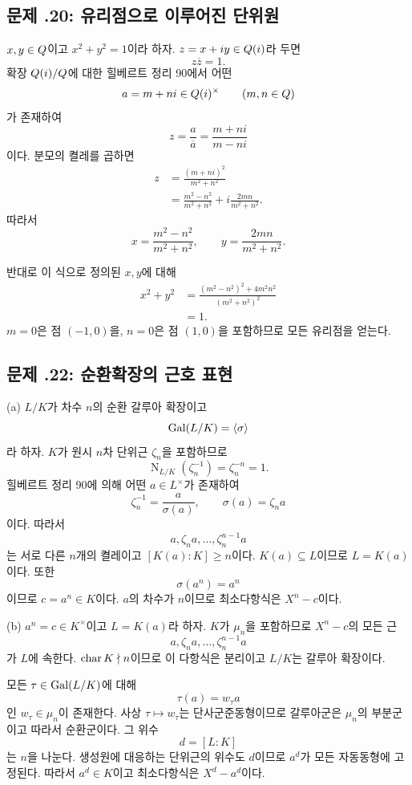 \subsection*{문제 \thechapter.20: 유리점으로 이루어진 단위원}

\begin{solution}
$x,y\in Q$이고 $x^2+y^2=1$이라 하자. $z=x+iy\in Q(i)$라 두면
\[
  z\overline z=1.
\]
확장 $Q(i)/Q$에 대한 힐베르트 정리 90에서 어떤
\[
  a=m+ni\in Q(i)^\times
  \qquad(m,n\in Q)
\]
가 존재하여
\[
  z=\frac{a}{\overline a}
  =\frac{m+ni}{m-ni}
\]
이다. 분모의 켤레를 곱하면
\[
\begin{aligned}
  z
  &=\frac{(m+ni)^2}{m^2+n^2}\\
  &=\frac{m^2-n^2}{m^2+n^2}
    +i\frac{2mn}{m^2+n^2}.
\end{aligned}
\]
따라서
\[
  x=\frac{m^2-n^2}{m^2+n^2},
  \qquad
  y=\frac{2mn}{m^2+n^2}.
\]

반대로 이 식으로 정의된 $x,y$에 대해
\[
\begin{aligned}
 x^2+y^2
 &=\frac{(m^2-n^2)^2+4m^2n^2}
 {(m^2+n^2)^2}\\
 &=1.
\end{aligned}
\]
$m=0$은 점 $(-1,0)$을, $n=0$은 점 $(1,0)$을 포함하므로 모든 유리점을 얻는다.
\end{solution}

\subsection*{문제 \thechapter.22: 순환확장의 근호 표현}

\begin{solution}
(a) $L/K$가 차수 $n$의 순환 갈루아 확장이고
\[
  \operatorname{Gal}(L/K)=\langle\sigma\rangle
\]
라 하자. $K$가 원시 $n$차 단위근 $\zeta_n$을 포함하므로
\[
  \operatorname N_{L/K}(\zeta_n^{-1})
  =\zeta_n^{-n}=1.
\]
힐베르트 정리 90에 의해 어떤 $a\in L^\times$가 존재하여
\[
  \zeta_n^{-1}=\frac{a}{\sigma(a)},
  \qquad
  \sigma(a)=\zeta_n a
\]
이다. 따라서
\[
  a,\zeta_na,\dots,\zeta_n^{n-1}a
\]
는 서로 다른 $n$개의 켤레이고 $[K(a):K]\ge n$이다. $K(a)\subseteq L$이므로 $L=K(a)$이다. 또한
\[
  \sigma(a^n)=a^n
\]
이므로 $c=a^n\in K$이다. $a$의 차수가 $n$이므로 최소다항식은 $X^n-c$이다.

(b) $a^n=c\in K^\times$이고 $L=K(a)$라 하자. $K$가 $\mu_n$을 포함하므로 $X^n-c$의 모든 근
\[
  a,\zeta_na,\dots,\zeta_n^{n-1}a
\]
가 $L$에 속한다. $\operatorname{char} K\nmid n$이므로 이 다항식은 분리이고 $L/K$는 갈루아 확장이다.

모든 $\tau\in\operatorname{Gal}(L/K)$에 대해
\[
  \tau(a)=w_\tau a
\]
인 $w_\tau\in\mu_n$이 존재한다. 사상 $\tau\mapsto w_\tau$는 단사군준동형이므로 갈루아군은 $\mu_n$의 부분군이고 따라서 순환군이다. 그 위수
\[
  d=[L:K]
\]
는 $n$을 나눈다. 생성원에 대응하는 단위근의 위수도 $d$이므로 $a^d$가 모든 자동동형에 고정된다. 따라서 $a^d\in K$이고 최소다항식은 $X^d-a^d$이다.
\end{solution}

